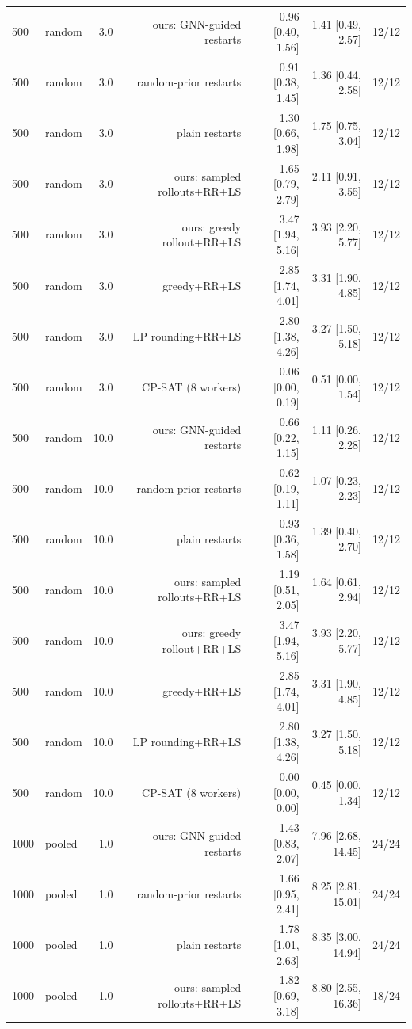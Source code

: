 \begin{table}[t]
\begin{tabular}{llrrrrr}
500 & random & 3.0 & ours: GNN-guided restarts & 0.96 [0.40, 1.56] & 1.41 [0.49, 2.57] & 12/12 \\
500 & random & 3.0 & random-prior restarts & 0.91 [0.38, 1.45] & 1.36 [0.44, 2.58] & 12/12 \\
500 & random & 3.0 & plain restarts & 1.30 [0.66, 1.98] & 1.75 [0.75, 3.04] & 12/12 \\
500 & random & 3.0 & ours: sampled rollouts+RR+LS & 1.65 [0.79, 2.79] & 2.11 [0.91, 3.55] & 12/12 \\
500 & random & 3.0 & ours: greedy rollout+RR+LS & 3.47 [1.94, 5.16] & 3.93 [2.20, 5.77] & 12/12 \\
500 & random & 3.0 & greedy+RR+LS & 2.85 [1.74, 4.01] & 3.31 [1.90, 4.85] & 12/12 \\
500 & random & 3.0 & LP rounding+RR+LS & 2.80 [1.38, 4.26] & 3.27 [1.50, 5.18] & 12/12 \\
500 & random & 3.0 & CP-SAT (8 workers) & 0.06 [0.00, 0.19] & 0.51 [0.00, 1.54] & 12/12 \\
500 & random & 10.0 & ours: GNN-guided restarts & 0.66 [0.22, 1.15] & 1.11 [0.26, 2.28] & 12/12 \\
500 & random & 10.0 & random-prior restarts & 0.62 [0.19, 1.11] & 1.07 [0.23, 2.23] & 12/12 \\
500 & random & 10.0 & plain restarts & 0.93 [0.36, 1.58] & 1.39 [0.40, 2.70] & 12/12 \\
500 & random & 10.0 & ours: sampled rollouts+RR+LS & 1.19 [0.51, 2.05] & 1.64 [0.61, 2.94] & 12/12 \\
500 & random & 10.0 & ours: greedy rollout+RR+LS & 3.47 [1.94, 5.16] & 3.93 [2.20, 5.77] & 12/12 \\
500 & random & 10.0 & greedy+RR+LS & 2.85 [1.74, 4.01] & 3.31 [1.90, 4.85] & 12/12 \\
500 & random & 10.0 & LP rounding+RR+LS & 2.80 [1.38, 4.26] & 3.27 [1.50, 5.18] & 12/12 \\
500 & random & 10.0 & CP-SAT (8 workers) & 0.00 [0.00, 0.00] & 0.45 [0.00, 1.34] & 12/12 \\
1000 & pooled & 1.0 & ours: GNN-guided restarts & 1.43 [0.83, 2.07] & 7.96 [2.68, 14.45] & 24/24 \\
1000 & pooled & 1.0 & random-prior restarts & 1.66 [0.95, 2.41] & 8.25 [2.81, 15.01] & 24/24 \\
1000 & pooled & 1.0 & plain restarts & 1.78 [1.01, 2.63] & 8.35 [3.00, 14.94] & 24/24 \\
1000 & pooled & 1.0 & ours: sampled rollouts+RR+LS & 1.82 [0.69, 3.18] & 8.80 [2.55, 16.36] & 18/24 \\

\end{tabular}
\end{table}
